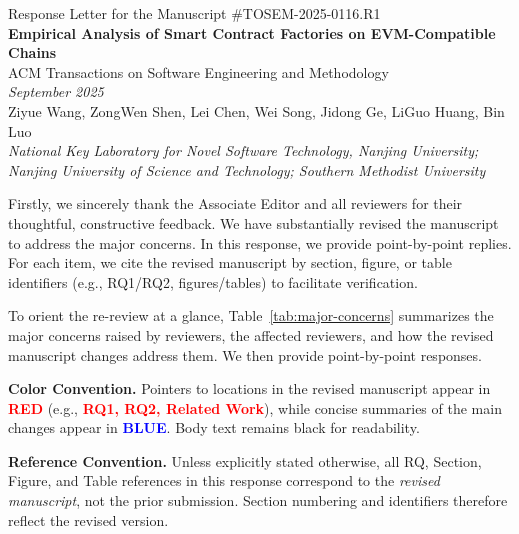 \documentclass[acmsmall]{acmart}
\begin{document}
	\pagestyle{plain}
	\begin{center}
		\Large Response Letter for the Manuscript \#TOSEM-2025-0116.R1 \\[1.5em] \LARGE\textbf{Empirical
		Analysis of Smart Contract Factories on EVM-Compatible Chains} \\[1.5em] \large ACM Transactions
		on Software Engineering and Methodology \\[1em] \normalsize \textit{September 2025}
		\\[1.5em] \normalsize Ziyue Wang, ZongWen Shen, Lei Chen, Wei Song, Jidong Ge, LiGuo Huang,
		Bin Luo \\[0.5em] \textit{National Key Laboratory for Novel Software Technology, Nanjing University;
		Nanjing University of Science and Technology; Southern Methodist University} \\[8em]
	\end{center}

	Firstly, we sincerely thank the Associate Editor and all reviewers for their thoughtful,
	constructive feedback. We have substantially revised the manuscript to address the major concerns.
	In this response, we provide point-by-point replies. For each item, we cite the revised manuscript
	by section, figure, or table identifiers (e.g., RQ1/RQ2, figures/tables) to facilitate
	verification.

	\vspace{0.5em}
	\noindent
	To orient the re-review at a glance, Table~\ref{tab:major-concerns} summarizes the major concerns
	raised by reviewers, the affected reviewers, and how the revised manuscript changes address them.
	We then provide point-by-point responses.

	\vspace{0.25em}
	\noindent
	\textbf{Color Convention.} Pointers to locations in the revised manuscript appear in \textcolor{red}{\textbf{RED}}
	(e.g., \textcolor{red}{\textbf{RQ1, RQ2, Related Work}}), while concise summaries of the main
	changes appear in \textcolor{blue}{\textbf{BLUE}}. Body text remains black for readability.

	\vspace{0.25em}
	\noindent
	\textbf{Reference Convention.} Unless explicitly stated otherwise, all RQ, Section, Figure, and Table
	references in this response correspond to the \emph{revised manuscript}, not the prior submission.
	Section numbering and identifiers therefore reflect the revised version.

	\newpage
\end{document}
